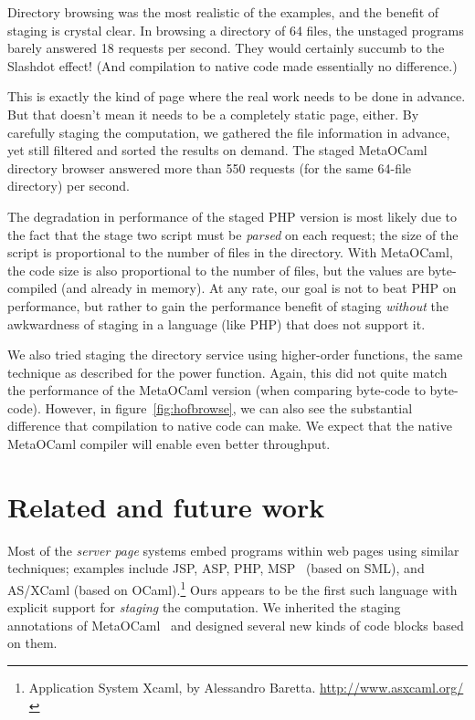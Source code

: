 \documentclass{elsart}
\def\MOC{MetaOCaml\xspace}
\begin{document}
Directory browsing was the most realistic of the examples, and the
benefit of staging is crystal clear.  In browsing a directory of 64
files, the unstaged programs barely answered 18 requests per second.
They would certainly succumb to the Slashdot effect!  (And compilation
to native code made essentially no difference.)

This is exactly the kind of page where the real work needs to be done
in advance.  But that doesn't mean it needs to be a completely static
page, either.  By carefully staging the computation, we gathered the
file information in advance, yet still filtered and sorted the results
on demand.  The staged \MOC directory browser answered more than 550
requests (for the same 64-file directory) per second.

The degradation in performance of the staged PHP version is most
likely due to the fact that the stage two script must be \emph{parsed}
on each request; the size of the script is proportional to the number
of files in the directory.  With \MOC, the code size is also
proportional to the number of files, but the values are byte-compiled
(and already in memory).  At any rate, our goal is not to beat PHP on
performance, but rather to gain the performance benefit of staging
\emph{without} the awkwardness of staging in a language (like PHP) that
does not support it.

We also tried staging the directory service using higher-order
functions, the same technique as described for the power function.
Again, this did not quite match the performance of the \MOC version
(when comparing byte-code to byte-code).  However, in
figure~\ref{fig:hofbrowse}, we can also see the substantial difference
that compilation to native code can make.  We expect that the native
\MOC compiler will enable even better throughput.


\section{Related and future work}
\label{sec:related}

Most of the \emph{server page} systems embed programs within web pages
using similar techniques; examples include JSP, ASP, PHP,
MSP~\cite{elsman03web} (based on SML), and AS/XCaml (based on
OCaml).\footnote{Application System Xcaml, by Alessandro Baretta.
  \url{http://www.asxcaml.org/}}
Ours appears to be the first such language with
explicit support for \emph{staging} the computation.  We inherited the
staging annotations of \MOC~\cite{calcagno03meta} and designed several
new kinds of code blocks based on them.
\end{document}
